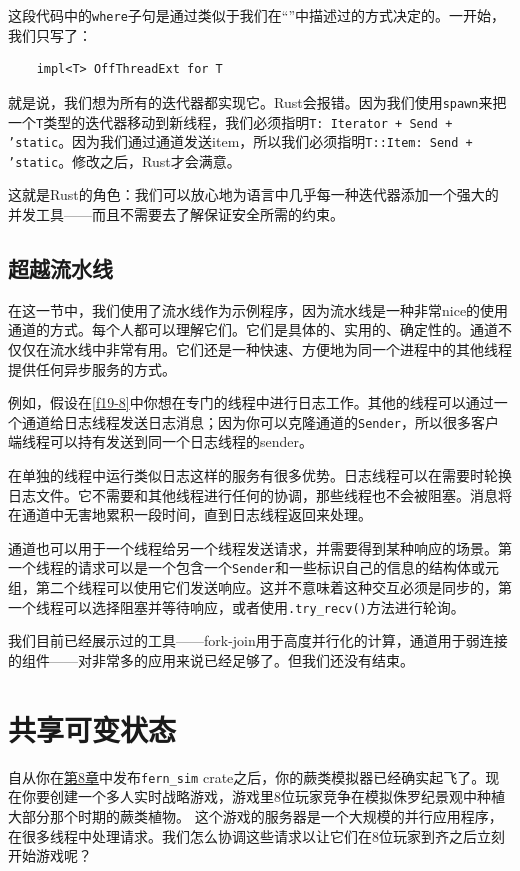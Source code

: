 这段代码中的\texttt{where}子句是通过类似于我们在“”中描述过的方式决定的。一开始，我们只写了：
\begin{verbatim}
    impl<T> OffThreadExt for T
\end{verbatim}

就是说，我们想为所有的迭代器都实现它。Rust会报错。因为我们使用\texttt{spawn}来把一个\texttt{T}类型的迭代器移动到新线程，我们必须指明\texttt{T: Iterator + Send + 'static}。因为我们通过通道发送item，所以我们必须指明\texttt{T::Item: Send + 'static}。修改之后，Rust才会满意。

这就是Rust的角色：我们可以放心地为语言中几乎每一种迭代器添加一个强大的并发工具——而且不需要去了解保证安全所需的约束。

\subsection{超越流水线}
在这一节中，我们使用了流水线作为示例程序，因为流水线是一种非常nice的使用通道的方式。每个人都可以理解它们。它们是具体的、实用的、确定性的。通道不仅仅在流水线中非常有用。它们还是一种快速、方便地为同一个进程中的其他线程提供任何异步服务的方式。

例如，假设在\autoref{f19-8}中你想在专门的线程中进行日志工作。其他的线程可以通过一个通道给日志线程发送日志消息；因为你可以克隆通道的\texttt{Sender}，所以很多客户端线程可以持有发送到同一个日志线程的sender。

在单独的线程中运行类似日志这样的服务有很多优势。日志线程可以在需要时轮换日志文件。它不需要和其他线程进行任何的协调，那些线程也不会被阻塞。消息将在通道中无害地累积一段时间，直到日志线程返回来处理。

通道也可以用于一个线程给另一个线程发送请求，并需要得到某种响应的场景。第一个线程的请求可以是一个包含一个\texttt{Sender}和一些标识自己的信息的结构体或元组，第二个线程可以使用它们发送响应。这并不意味着这种交互必须是同步的，第一个线程可以选择阻塞并等待响应，或者使用\texttt{.try\_recv()}方法进行轮询。

我们目前已经展示过的工具——fork-join用于高度并行化的计算，通道用于弱连接的组件——对非常多的应用来说已经足够了。但我们还没有结束。

\section{共享可变状态}

自从你在\hyperref[ch08]{第8章}中发布\texttt{fern\_sim} crate之后，你的蕨类模拟器已经确实起飞了。现在你要创建一个多人实时战略游戏，游戏里8位玩家竞争在模拟侏罗纪景观中种植大部分那个时期的蕨类植物。 这个游戏的服务器是一个大规模的并行应用程序，在很多线程中处理请求。我们怎么协调这些请求以让它们在8位玩家到齐之后立刻开始游戏呢？

